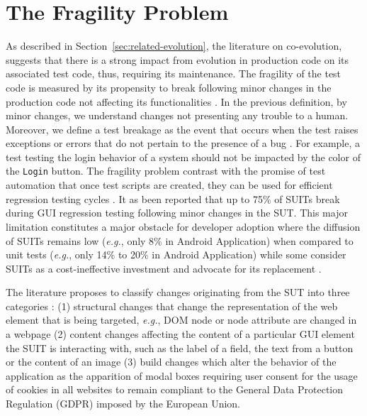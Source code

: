 \section{The Fragility Problem}
\label{sec:related-fragility}

As described in Section~\ref{sec:related-evolution}, the literature on co-evolution, suggests that there is a strong impact from evolution in production code on its associated test code, thus, requiring its maintenance. The fragility of the test code is measured by its propensity to break following minor changes in the production code not affecting its functionalities \cite{Garousi2016, Coppola2019}. In the previous definition, by minor changes, we understand changes not presenting any trouble to a human. Moreover, we define a test breakage as the event that occurs when the test raises exceptions or errors that do not pertain to the presence of a bug \cite{Stocco2018}. For example, a test testing the login behavior of a system should not be impacted by the color of the \texttt{Login} button. The fragility problem contrast with the promise of test automation that once test scripts are created, they can be used for efficient regression testing cycles \cite{Yandrapally2014}.  It as been reported that up to 75\% of SUITs break during GUI regression testing \cite{Memon2003a, Grechanik2009, Coppola2016} following minor changes in the SUT. This major limitation constitutes a major obstacle for developer adoption where the diffusion of SUITs remains low (\emph{e.g.}, only 8\% \cite{Coppola2017, Coppola2019b} in Android Application) when compared to unit tests (\emph{e.g.}, only 14\% \cite{Kochhar2015} to 20\% \cite{Coppola2017, Coppola2019b} in Android Application) while some consider SUITs as a cost-ineffective investment and advocate for its replacement \cite{Vliegendhart2012, Chen2020}.

The literature proposes to classify changes originating from the SUT into three categories \cite{Choudhary2011, Yandrapally2014, Coppola2016}: (1) structural changes that change the representation of the web element that is being targeted, \emph{e.g.}, DOM node or node attribute are changed in a webpage (2) content changes affecting the content of a particular GUI element the SUIT is interacting with, such as the label of a field, the text from a button or the content of an image (3) build changes which alter the behavior of the application as the apparition of modal boxes requiring user consent for the usage of cookies in all websites to remain compliant to the General Data Protection Regulation (GDPR) imposed by the European Union.

